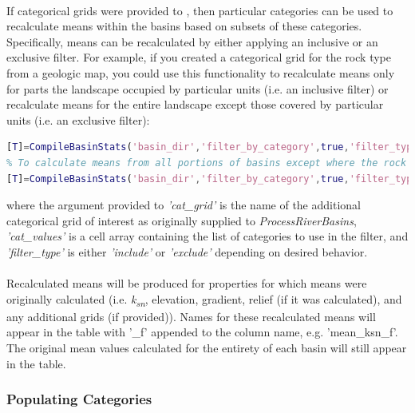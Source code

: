 \paragraph{}If categorical grids were provided to , then particular categories can be used to recalculate means within the basins based on subsets of these categories. Specifically, means can be recalculated by either applying an inclusive or an exclusive filter. For example, if you created a categorical grid for the rock type from a geologic map, you could use this functionality to recalculate means only for parts the landscape occupied by particular units (i.e. an inclusive filter) or recalculate means for the entire landscape except those covered by particular units (i.e. an exclusive filter):

\begin{lstlisting}[language=Matlab]
% To calculate means only from portions of a basin defined by certain rock types
[T]=CompileBasinStats('basin_dir','filter_by_category',true,'filter_type','include','cat_grid','geology','cat_values',{'pCc','grMz','pC','gr-m','Pc','grPz','grpC','gr'});
% To calculate means from all portions of basins except where the rock types are certain types
[T]=CompileBasinStats('basin_dir','filter_by_category',true,'filter_type','exclude','cat_grid','geology','cat_values',{'Q','Qpc','Qg','Qls','Qs','Qv','water','undef'});
\end{lstlisting}

\noindent
where the argument provided to \textit{'cat\_grid'} is the name of the additional categorical grid of interest as originally supplied to \textit{ProcessRiverBasins}, \textit{'cat\_values'} is a cell array containing the list of categories to use in the filter, and \textit{'filter\_type'} is either \textit{'include'} or \textit{'exclude'} depending on desired behavior.

\paragraph{}Recalculated means will be produced for properties for which means were originally calculated (i.e. \textit{k\textsubscript{sn}}, elevation, gradient, relief (if it was calculated), and any additional grids (if provided)). Names for these recalculated means will appear in the table with '\_f' appended to the column name, e.g. 'mean\_ksn\_f'. The original mean values calculated for the entirety of each basin will still appear in the table.

\subsubsection{Populating Categories}
